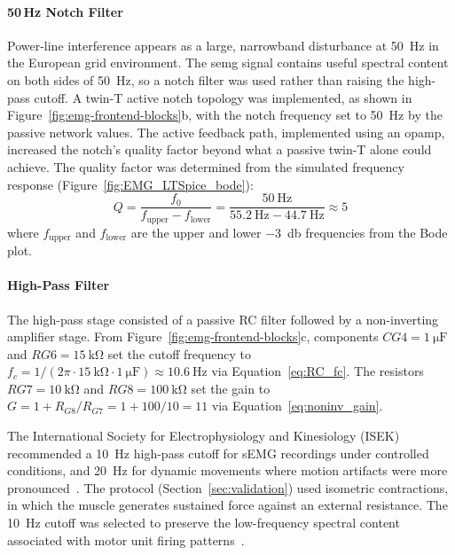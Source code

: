 \paragraph{50\,Hz Notch Filter}
Power-line interference appears as a large, narrowband disturbance at \SI{50}{\hertz} in the European grid environment. The \gls{semg} signal contains useful spectral content on both sides of \SI{50}{\hertz}, so a notch filter was used rather than raising the high-pass cutoff.
A twin-T active notch topology was implemented, as shown in Figure~\ref{fig:emg-frontend-blocks}b, with the notch frequency set to \SI{50}{\hertz} by the passive network values. The active feedback path, implemented using an \gls{opamp}, increased the notch's quality factor beyond what a passive twin-T alone could achieve.
The quality factor was determined from the simulated frequency response (Figure~\ref{fig:EMG_LTSpice_bode}):
\begin{equation}
    Q = \frac{f_0}{f_\text{upper} - f_\text{lower}} 
    = \frac{\SI{50}{\hertz}}{\SI{55.2}{\hertz} - \SI{44.7}{\hertz}} 
    \approx 5
    \label{eq:notch_q}
\end{equation}
where $f_\text{upper}$ and $f_\text{lower}$ are the upper and lower \SI{-3}{\decibel} frequencies from the Bode plot.


\paragraph{High-Pass Filter} %
\label{sec:EMG_hpf}
The high-pass stage consisted of a passive RC filter followed by a non-inverting amplifier stage. From Figure~\ref{fig:emg-frontend-blocks}c, components $CG4 = \SI{1}{\micro\farad}$ and $RG6 = \SI{15}{\kilo\ohm}$ set the cutoff frequency to $f_c = 1/(2\pi \cdot \SI{15}{\kilo\ohm} \cdot \SI{1}{\micro\farad}) \approx \SI{10.6}{\hertz}$ via Equation~\ref{eq:RC_fc}. The resistors $RG7 = \SI{10}{\kilo\ohm}$ and $RG8 = \SI{100}{\kilo\ohm}$ set the gain to $G = 1 + R_{G8}/R_{G7} = 1 + 100/10 = 11$ via Equation~\ref{eq:noninv_gain}.

The International Society for Electrophysiology and Kinesiology (ISEK) recommended a \SI{10}{\hertz} high-pass cutoff for sEMG recordings under controlled conditions, and \SI{20}{\hertz} for dynamic movements where motion artifacts were more pronounced~\cite{kamen_essentials_2010}. The protocol (Section~\ref{sec:validation}) used isometric contractions, in which the muscle generates sustained force against an external resistance. The \SI{10}{\hertz} cutoff was selected to preserve the low-frequency spectral content associated with motor unit firing patterns~\cite{kamen_essentials_2010}.


